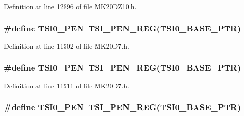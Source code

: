 Definition at line 12896 of file M\+K20\+D\+Z10.\+h.

\subsubsection[{\texorpdfstring{T\+S\+I0\+\_\+\+P\+EN}{TSI0_PEN}}]{\setlength{\rightskip}{0pt plus 5cm}\#define T\+S\+I0\+\_\+\+P\+EN~{\bf T\+S\+I\+\_\+\+P\+E\+N\+\_\+\+R\+EG}({\bf T\+S\+I0\+\_\+\+B\+A\+S\+E\+\_\+\+P\+TR})}\hypertarget{group___t_s_i___register___accessor___macros_gad706463b129b8eb7c63be3d033eb5da6}{}\label{group___t_s_i___register___accessor___macros_gad706463b129b8eb7c63be3d033eb5da6}


Definition at line 11502 of file M\+K20\+D7.\+h.

\subsubsection[{\texorpdfstring{T\+S\+I0\+\_\+\+P\+EN}{TSI0_PEN}}]{\setlength{\rightskip}{0pt plus 5cm}\#define T\+S\+I0\+\_\+\+P\+EN~{\bf T\+S\+I\+\_\+\+P\+E\+N\+\_\+\+R\+EG}({\bf T\+S\+I0\+\_\+\+B\+A\+S\+E\+\_\+\+P\+TR})}\hypertarget{group___t_s_i___register___accessor___macros_gad706463b129b8eb7c63be3d033eb5da6}{}\label{group___t_s_i___register___accessor___macros_gad706463b129b8eb7c63be3d033eb5da6}


Definition at line 11511 of file M\+K20\+D7.\+h.

\subsubsection[{\texorpdfstring{T\+S\+I0\+\_\+\+P\+EN}{TSI0_PEN}}]{\setlength{\rightskip}{0pt plus 5cm}\#define T\+S\+I0\+\_\+\+P\+EN~{\bf T\+S\+I\+\_\+\+P\+E\+N\+\_\+\+R\+EG}({\bf T\+S\+I0\+\_\+\+B\+A\+S\+E\+\_\+\+P\+TR})}\hypertarget{group___t_s_i___register___accessor___macros_gad706463b129b8eb7c63be3d033eb5da6}{}\label{group___t_s_i___register___accessor___macros_gad706463b129b8eb7c63be3d033eb5da6}


